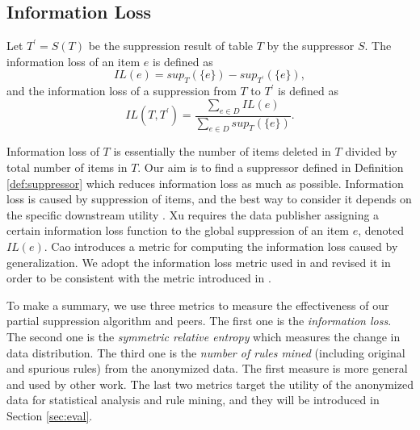 \subsection{Information Loss}
\begin{definition}
\label{def:infoloss}
Let $T^\prime = S(T)$ be the suppression result of table $T$ by the suppressor $S$.
The information loss of an item $e$ is defined as
\[ IL(e) = sup_{T}(\{e\}) - sup_{T^\prime}(\{e\}), \]
and the information loss of a suppression from $T$ to $T^\prime$ is defined as
\[ IL(T,T^\prime) = \frac{\sum_{e\in D}IL(e)}{\sum_{e\in D}sup_{T}(\{e\})}. \]
\end{definition}

Information loss of $T$ is essentially the number of items deleted in $T$
divided by total number of items in $T$. Our aim is to find a suppressor
defined in Definition \ref{def:suppressor} which reduces information loss as
much as possible. Information
loss is caused by suppression of items, and the best way to consider it
depends on the specific downstream utility \cite{Xu:2008:ATD}. Xu \etal
\cite{Xu:2008:ATD} requires the data publisher assigning a certain
information loss function to the global suppression of an item $e$, denoted
$IL(e)$.
Cao \etal
\cite{Cao:2010:rho} introduces a metric for computing the information loss
caused by generalization.
We adopt the information loss metric used in \cite{Xu:2008:ATD}
and revised it in order to be consistent with the metric introduced in \cite{Cao:2010:rho}.

To make a summary,
we use three metrics to measure the effectiveness of our partial suppression
algorithm and peers. The first one is the \emph{information loss}. The second
one is the \emph{symmetric relative entropy} which measures the change in
data distribution. The third one is the \emph{number of rules mined}
(including original and spurious rules) from the anonymized data. The first
measure is more general and used by other work. The last two metrics target
the utility of the anonymized data for statistical analysis and rule mining,
and they will be introduced in Section \ref{sec:eval}.

